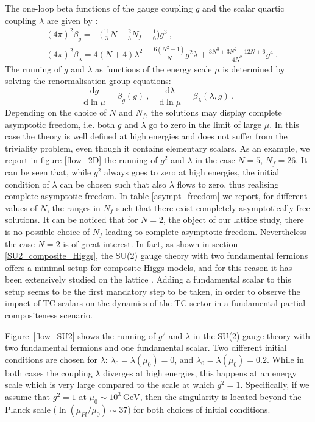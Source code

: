 The one-loop beta functions of the gauge coupling $g$ and the scalar quartic coupling $\lambda$ are given by \cite{Sannino:2016sfx}:
\begin{equation}
\begin{split}
 & (4 \pi)^2 \beta_g = - \biggl( \frac{11}{3} N - \frac{2}{3} N_f - \frac{1}{6} \biggr) g^3 \: ,\\
 & (4 \pi)^2 \beta_{\lambda} = 4(N +4) \lambda^2 -\frac{6(N^2 -1)}{N} g^2 \lambda + \frac{3N^3 + 3N^2 -12N + 6}{4 N^2} g^4 \: .
 \label{beta_functions}
\end{split}
\end{equation}
%
The running of $g$ and $\lambda$ as functions of the energy scale $\mu$ is determined by solving the renormalisation group equations:
\begin{equation}
\frac{\mathrm d g}{\mathrm d \ln \mu} = \beta_g (g) \: ,  \quad \frac{\mathrm d \lambda}{\mathrm d \ln \mu} = \beta_{\lambda} (\lambda,g) \: .
\end{equation}
%
Depending on the choice of $N$ and $N_f$, the solutions may display complete asymptotic freedom, i.e. both $g$ and $\lambda$ go to zero in the limit of large $\mu$. In this case the theory is well defined at high energies and does not suffer from the triviality problem, even though it contains elementary scalars.  As an example, we report in figure \ref{flow_2D} the running of $g^2$ and $\lambda$ in the case $N=5$, $N_f=26$. It can be seen that, while $g^2$ always goes to zero at high energies, the initial condition of $\lambda$ can be chosen such that also $\lambda$ flows to zero, thus realising complete asymptotic freedom. In table \ref{asympt_freedom} we report, for different values of $N$, the ranges in $N_f$ such that there exist completely asymptotically free solutions. It can be noticed that for $N=2$, the object of our lattice study, there is no possible choice of $N_f$ leading to complete asymptotic freedom. Nevertheless the case $N=2$ is of great interest. In fact, as shown in section \ref{SU2_composite_Higgs}, the SU(2) gauge theory with two fundamental fermions offers a minimal setup for composite Higgs models, and for this reason it has been extensively studied on the lattice \cite{Arthur:2016dir}. Adding a fundamental scalar to this setup seems to be the first mandatory step to be taken, in order to observe the impact of TC-scalars on the dynamics of the TC sector in a fundamental partial compositeness scenario.

Figure~\ref{flow_SU2} shows the running of $g^2$ and $\lambda$ in the SU(2) gauge theory with two fundamental fermions and one fundamental scalar. 
Two different initial conditions are chosen for $\lambda$: $\lambda_0 = \lambda(\mu_0) = 0$, and $\lambda_0=\lambda(\mu_0)=0.2$. 
While in both cases the coupling $\lambda$ diverges at high energies, this happens at an energy scale which is very large compared to the scale at which $g^2=1$. Specifically, if we assume that $g^2=1$ at $\mu_0 \sim 10^3 \: \mathrm{GeV}$, then the singularity is located beyond the Planck scale ($\ln(\mu_{Pl} / \mu_0) \sim 37$) for both choices of initial conditions. 



